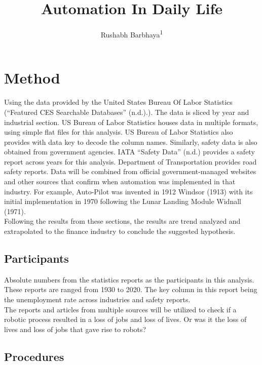 \documentclass[
  english,
  man]{apa7}
\title{Automation In Daily Life}
\author{Rushabh Barbhaya\textsuperscript{1}}
\date{}
\affiliation{\vspace{0.5cm}\textsuperscript{1} Harrisburg University of Science and Technology}
\begin{document}
\maketitle

\hypertarget{method}{%
\section{Method}\label{method}}

Using the data provided by the United States Bureau Of Labor Statistics ({``Featured CES Searchable Databases''} (n.d.).). The data is sliced by year and industrial section. US Bureau of Labor Statistics houses data in multiple formats, using simple flat files for this analysis. US Bureau of Labor Statistics also provides with data key to decode the column names. Similarly, safety data is also obtained from government agencies. IATA {``Safety Data''} (n.d.) provides a safety report across years for this analysis. Department of Transportation provides road safety reports. Data will be combined from official government-managed websites and other sources that confirm when automation was implemented in that industry. For example, Auto-Pilot was invented in 1912 Windsor (1913) with its initial implementation in 1970 following the Lunar Landing Module Widnall (1971).\\
Following the results from these sections, the results are trend analyzed and extrapolated to the finance industry to conclude the suggested hypothesis.

\hypertarget{participants}{%
\subsection{Participants}\label{participants}}

Absolute numbers from the statistics reports as the participants in this analysis. These reports are ranged from 1930 to 2020. The key column in this report being the unemployment rate across industries and safety reports.\\
The reports and articles from multiple sources will be utilized to check if a robotic process resulted in a loss of jobs and loss of lives. Or was it the loss of lives and loss of jobs that gave rise to robots?

\hypertarget{procedures}{%
\subsection{Procedures}\label{procedures}}
\end{document}
